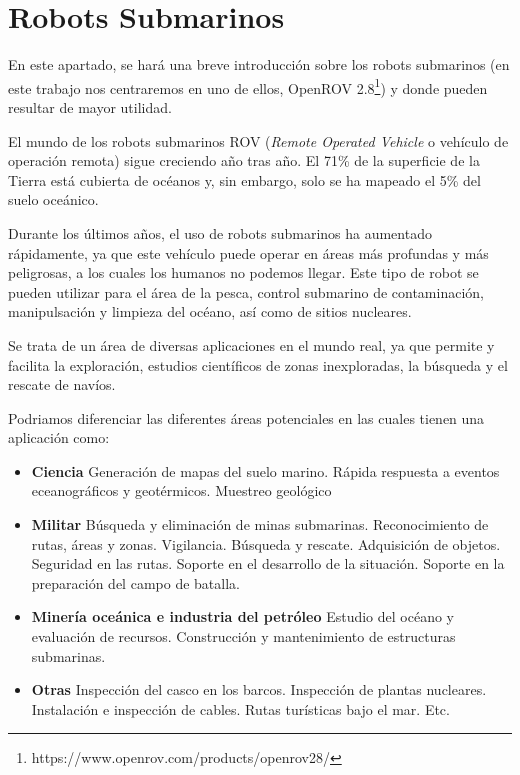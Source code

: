 \section{Robots Submarinos}
\label{cap:Robots Submarinos}
En este apartado, se hará una breve introducción sobre los robots submarinos (en este trabajo nos centraremos en uno de ellos, OpenROV 2.8\footnote{https://www.openrov.com/products/openrov28/}) y donde pueden resultar de mayor utilidad.

El mundo de los robots submarinos ROV (\textit{Remote Operated Vehicle} o vehículo de operación remota) sigue creciendo año tras año. El 71\% de la superficie de la Tierra está cubierta de océanos y, sin embargo, solo se ha mapeado el 5\% del suelo oceánico.

Durante los últimos años, el uso de robots submarinos ha aumentado rápidamente, ya que este vehículo puede operar en áreas más profundas y más peligrosas, a los cuales los humanos no podemos llegar. Este tipo de robot se pueden utilizar para el área de la pesca, control submarino de contaminación, manipulsación y limpieza del océano, así como de sitios nucleares.

Se trata de un área de diversas aplicaciones en el mundo real, ya que permite y facilita la exploración, estudios científicos de zonas inexploradas, la búsqueda y el rescate de navíos.

Podriamos diferenciar las diferentes áreas potenciales en las cuales tienen una aplicación como:

  \begin{itemize}
  \item \textbf{Ciencia}
    \subitem Generación de mapas del suelo marino.
    \subitem Rápida respuesta a eventos eceanográficos y geotérmicos.
    \subitem Muestreo geológico
  \item \textbf{Militar}
   \subitem Búsqueda y eliminación de minas submarinas. 
   \subitem Reconocimiento de rutas, áreas y zonas. 
   \subitem Vigilancia. 
   \subitem Búsqueda y rescate. 
   \subitem Adquisición de objetos. 
   \subitem Seguridad en las rutas. 
   \subitem Soporte en el desarrollo de la situación. 
   \subitem Soporte en la preparación del campo de batalla. 
  \item \textbf{Minería oceánica e industria del petróleo}
    \subitem Estudio del océano y evaluación de recursos.
    \subitem Construcción y mantenimiento de estructuras submarinas.
  \item \textbf{Otras}
    \subitem Inspección del casco en los barcos.
    \subitem Inspección de plantas nucleares.
    \subitem Instalación e inspección de cables. 
    \subitem Rutas turísticas bajo el mar.
    \subitem Etc.
 \end{itemize}


